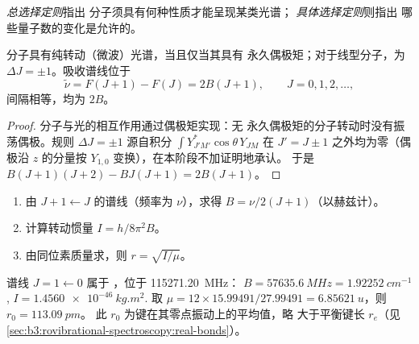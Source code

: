 \begin{definition}[总选择定则与具体选择定则]\label{def:b3:rovibrational-spectroscopy:selection}
\emph{总选择定则}指出
分子须具有何种性质才能呈现某类光谱；
\emph{具体选择定则}则指出
哪些量子数的变化是允许的。
\end{definition}

\begin{proposition}[纯转动光谱]\label{prop:b3:rovibrational-spectroscopy:rotational-lines}
分子具有纯转动（微波）光谱，当且仅当其具有
永久偶极矩；对于线型分子，为 $\Delta J
= \pm1$。吸收谱线位于
\[
\tilde\nu = F(J+1) - F(J) = 2B(J + 1), \qquad J = 0, 1, 2, \dots,
\]
间隔相等，均为 $2B$。
\end{proposition}

\begin{proof}
分子与光的相互作用通过偶极矩实现：无
永久偶极矩的分子转动时没有振荡偶极。规则 $\Delta J
= \pm1$ 源自积分 $\int Y_{J'M'}^*\cos\theta\,Y_{JM}$ 在 $J' = J
\pm 1$ 之外均为零（偶极沿 $z$ 的分量按 $Y_{1,0}$ 变换），在本阶段不加证明地承认。
于是 $B(J+1)(J+2) - BJ(J+1) = 2B(J+1)$。
\end{proof}

\begin{method}[由转动谱线求键长]\label{met:b3:rovibrational-spectroscopy:bond-length}
\begin{enumerate}
  \item 由 $J + 1 \leftarrow J$ 的谱线（频率为 $\nu$），求得 $B =
        \nu/2(J+1)$（以赫兹计）。
  \item 计算转动惯量 $I = h/8\pi^2B$。
  \item 由同位素质量求，则 $r = \sqrt{I/\mu}$。
\end{enumerate}
\end{method}

\begin{example}[一氧化碳]\label{ex:b3:rovibrational-spectroscopy:co}
谱线 $J = 1 \leftarrow 0$ 属于 ，位于 \qty{115271.20}{MHz}：
$B = \qty{57635.6}{MHz} = \qty{1.92252}{cm^{-1}}$, $I = \qty{1.4560e-46}{kg.m^2}$.
取 $\mu = 12 \times 15.99491/27.99491 = \qty{6.85621}{u}$，则 $r_0 = \qty{113.09}{pm}$。
此 $r_0$ 为键在其零点振动上的平均值，略
大于平衡键长 $r_e$（见\cref{sec:b3:rovibrational-spectroscopy:real-bonds}）。
\end{example}

